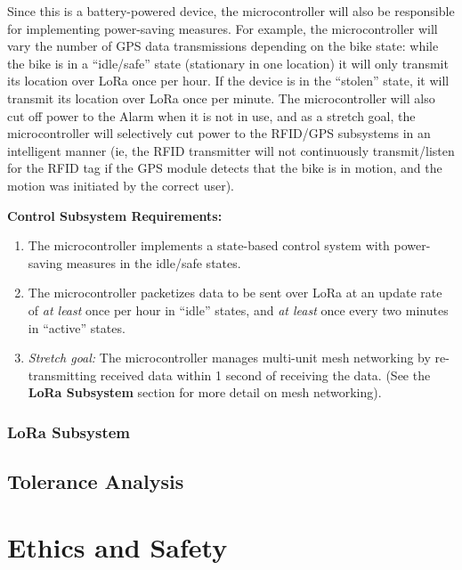 \documentclass[]{article}
\begin{document}
 Since this is a battery-powered device, the microcontroller will also be responsible for implementing power-saving measures. For example, the microcontroller will vary the number of GPS data transmissions depending on the bike state: while the bike is in a “idle/safe” state (stationary in one location) it will only transmit its location over LoRa once per hour. If the device is in the “stolen” state, it will transmit its location over LoRa once per minute. The microcontroller will also cut off power to the Alarm when it is not in use, and as a stretch goal, the microcontroller will selectively cut power to the RFID/GPS subsystems in an intelligent manner (ie, the RFID transmitter will not continuously transmit/listen for the RFID tag if the GPS module detects that the bike is in motion, and the motion was initiated by the correct user). 


\textbf{Control Subsystem Requirements:}

\begin{enumerate}
	\item The microcontroller implements a state-based control system with power-saving measures in the idle/safe states. 
	\item The microcontroller packetizes data to be sent over LoRa at an update rate of \textit{at least }once per hour in “idle” states, and \textit{at least} once every two minutes in “active” states. 
	\item \textit{Stretch goal:} The microcontroller manages multi-unit mesh networking by re-transmitting received data within 1 second of receiving the data. (See the \textbf{LoRa Subsystem} section for more detail on mesh networking). 
\end{enumerate}


\subsubsection{LoRa Subsystem}



\subsection{Tolerance Analysis}

\section{Ethics and Safety}
\end{document}
